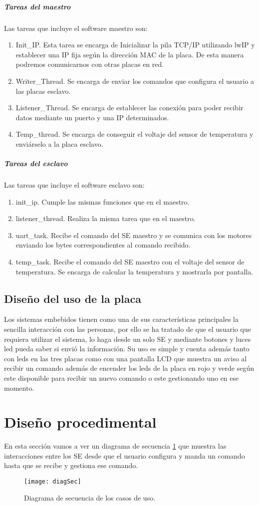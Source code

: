 \subparagraph{Tareas del maestro}
Las tareas que incluye el software maestro son:
\begin{enumerate}
    \item Init\_IP. Esta tarea se encarga de Inicializar la pila TCP/IP utilizando lwIP y establecer una IP fija según la dirección MAC de la placa. De esta manera podremos comunicarnos con otras placas en red.
    \item Writer\_Thread. Se encarga de enviar los comandos que configura el usuario a las placas esclavo.
    \item Listener\_Thread. Se encarga de establecer las conexión para poder recibir datos mediante un puerto y una IP determinados.
    \item Temp\_thread. Se encarga de conseguir el voltaje del sensor de temperatura y enviárselo a la placa esclavo.
\end{enumerate}

\subparagraph{Tareas del esclavo}
Las tareas que incluye el software esclavo son:
\begin{enumerate}
    \item init\_ip. Cumple las mismas funciones que en el maestro.
    \item listener\_thread. Realiza la misma tarea que en el maestro.
    \item uart\_task. Recibe el comando del SE maestro y se comunica con los motores enviando los bytes correspondientes al comando recibido.
    \item temp\_task. Recibe el comando del SE maestro con el voltaje del sensor de temperatura. Se encarga de calcular la temperatura y mostrarla por pantalla.
\end{enumerate}

\subsection{Diseño del uso de la placa}
Los sistemas embebidos tienen como una de sus características principales la sencilla interacción con las personas, por ello se ha tratado de que el usuario que requiera utilizar el sistema, lo haga desde un solo SE y mediante botones y luces led pueda saber si envió la información. Su uso es simple y cuenta además tanto con leds en las tres placas como con una pantalla LCD que muestra un aviso al recibir un comando además de encender los leds de la placa en rojo y verde según este disponible para recibir un nuevo comando o este gestionando uno en ese momento.


\section{Diseño procedimental}
En esta sección vamos a ver un diagrama de secuencia \ref{diagSecc} que muestra las interacciones entre los SE desde que el usuario configura y manda un comando hasta que se recibe y gestiona ese comando. 

\begin{figure}%
    \begin{center}%
    \texttt{[image: diagSec]}%
    \caption{Diagrama de secuencia de los casos de uso.}%
    \label{diagSecc}%
 \end{center}%
 \end{figure}%